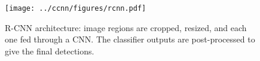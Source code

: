 \begin{figure}[ht]
\begin{center}
\texttt{[image: ../ccnn/figures/rcnn.pdf]}
\caption{
R-CNN architecture: image regions are cropped, resized, and each one fed through a CNN.
The classifier outputs are post-processed to give the final detections.
}\label{fig:rcnn}
\end{center}
\end{figure}
